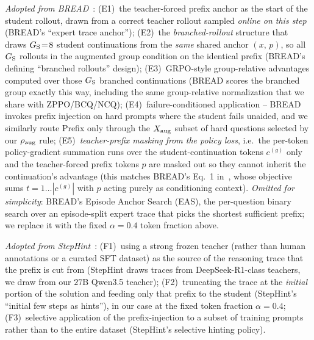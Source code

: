 \emph{Adopted from BREAD}~\citep{zhang2025bread}: (E1)~the teacher-forced prefix anchor as the start of the student rollout, drawn from a correct teacher rollout sampled \emph{online on this step} (BREAD's ``expert trace anchor''); (E2)~the \emph{branched-rollout} structure that draws $G_{\rm S}\!=\!8$ student continuations from the \emph{same} shared anchor $(x,\,p)$, so all $G_{\rm S}$ rollouts in the augmented group condition on the identical prefix (BREAD's defining ``branched rollouts'' design); (E3)~GRPO-style group-relative advantages computed over those $G_{\rm S}$ branched continuations (BREAD scores the branched group exactly this way, including the same group-relative normalization that we share with ZPPO/BCQ/NCQ); (E4)~failure-conditioned application -- BREAD invokes prefix injection on hard prompts where the student fails unaided, and we similarly route Prefix only through the $X_{\rm aug}$ subset of hard questions selected by our $\rho_{\rm aug}$ rule; (E5)~\emph{teacher-prefix masking from the policy loss}, i.e.\ the per-token policy-gradient summation runs over the student-continuation tokens $c^{(g)}$ only and the teacher-forced prefix tokens $p$ are masked out so they cannot inherit the continuation's advantage (this matches BREAD's Eq.~1 in~\citep{zhang2025bread}, whose objective sums $t\!=\!1\ldots|c^{(g)}|$ with $p$ acting purely as conditioning context). \emph{Omitted for simplicity}: BREAD's Episode Anchor Search (EAS), the per-question binary search over an episode-split expert trace that picks the shortest sufficient prefix; we replace it with the fixed $\alpha\!=\!0.4$ token fraction above.

\emph{Adopted from StepHint}~\citep{zhang2025stephint}: (F1)~using a strong frozen teacher (rather than human annotations or a curated SFT dataset) as the source of the reasoning trace that the prefix is cut from (StepHint draws traces from DeepSeek-R1-class teachers, we draw from our $27$B Qwen3.5 teacher); (F2)~truncating the trace at the \emph{initial} portion of the solution and feeding only that prefix to the student (StepHint's ``initial few steps as hints''), in our case at the fixed token fraction $\alpha\!=\!0.4$; (F3)~selective application of the prefix-injection to a subset of training prompts rather than to the entire dataset (StepHint's selective hinting policy).

